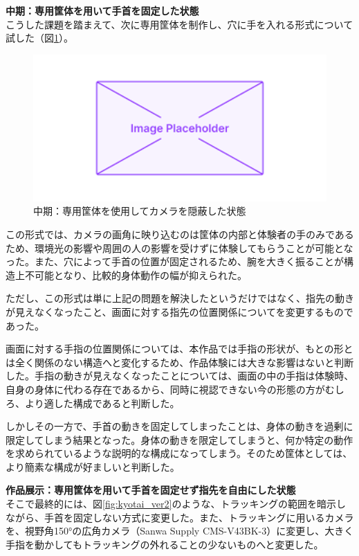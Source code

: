 \textbf{中期：専用筐体を用いて手首を固定した状態}\\
こうした課題を踏まえて、次に専用筐体を制作し、穴に手を入れる形式について試した（図\ref{fig:kyotai_ver1}）。

\begin{figure}[H]
  \centering
  \includegraphics[width=15cm]{img/placeholder.png}
  \caption{中期：専用筐体を使用してカメラを隠蔽した状態}
  \label{fig:kyotai_ver1}
\end{figure}

この形式では、カメラの画角に映り込むのは筐体の内部と体験者の手のみであるため、環境光の影響や周囲の人の影響を受けずに体験してもらうことが可能となった。また、穴によって手首の位置が固定されるため、腕を大きく振ることが構造上不可能となり、比較的身体動作の幅が抑えられた。

ただし、この形式は単に上記の問題を解決したというだけではなく、指先の動きが見えなくなったこと、画面に対する指先の位置関係についてを変更するものであった。

画面に対する手指の位置関係については、本作品では手指の形状が、もとの形とは全く関係のない構造へと変化するため、作品体験には大きな影響はないと判断した。手指の動きが見えなくなったことについては、画面の中の手指は体験時、自身の身体に代わる存在であるから、同時に視認できない今の形態の方がむしろ、より適した構成であると判断した。

しかしその一方で、手首の動きを固定してしまったことは、身体の動きを過剰に限定してしまう結果となった。身体の動きを限定してしまうと、何か特定の動作を求められているような説明的な構成になってしまう。そのため筐体としては、より簡素な構成が好ましいと判断した。


\textbf{作品展示：専用筐体を用いて手首を固定せず指先を自由にした状態}\\
そこで最終的には、図\ref{fig:kyotai_ver2}のような、トラッキングの範囲を暗示しながら、手首を固定しない方式に変更した。また、トラッキングに用いるカメラを、視野角150°の広角カメラ（Sanwa Supply CMS-V43BK-3）に変更し、大きく手指を動かしてもトラッキングの外れることの少ないものへと変更した。

